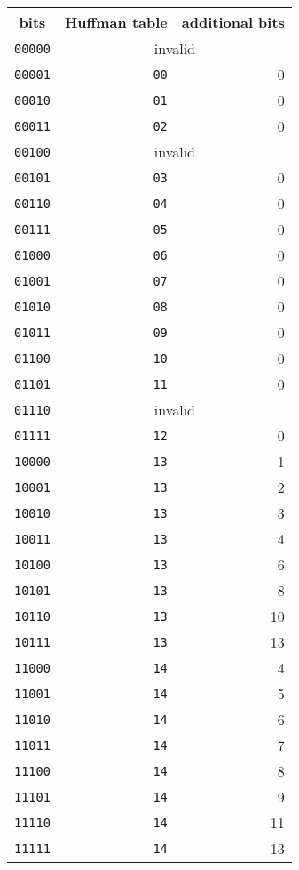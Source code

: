 \documentclass[letter]{scrbook}
\begin{document}
\begin{table}[h]
\begin{tabular}{|c|r|r|}
\hline
bits & Huffman table & additional bits \\
\hline
\texttt{00000} & \multicolumn{2}{c|}{invalid} \\
\texttt{00001} & \texttt{00} & 0 \\
\texttt{00010} & \texttt{01} & 0 \\
\texttt{00011} & \texttt{02} & 0 \\
\texttt{00100} & \multicolumn{2}{c|}{invalid} \\
\texttt{00101} & \texttt{03} & 0 \\
\texttt{00110} & \texttt{04} & 0 \\
\texttt{00111} & \texttt{05} & 0 \\
\texttt{01000} & \texttt{06} & 0 \\
\texttt{01001} & \texttt{07} & 0 \\
\texttt{01010} & \texttt{08} & 0 \\
\texttt{01011} & \texttt{09} & 0 \\
\texttt{01100} & \texttt{10} & 0 \\
\texttt{01101} & \texttt{11} & 0 \\
\texttt{01110} & \multicolumn{2}{c|}{invalid} \\
\texttt{01111} & \texttt{12} & 0 \\
\texttt{10000} & \texttt{13} & 1 \\
\texttt{10001} & \texttt{13} & 2 \\
\texttt{10010} & \texttt{13} & 3 \\
\texttt{10011} & \texttt{13} & 4 \\
\texttt{10100} & \texttt{13} & 6 \\
\texttt{10101} & \texttt{13} & 8 \\
\texttt{10110} & \texttt{13} & 10 \\
\texttt{10111} & \texttt{13} & 13 \\
\texttt{11000} & \texttt{14} & 4 \\
\texttt{11001} & \texttt{14} & 5 \\
\texttt{11010} & \texttt{14} & 6 \\
\texttt{11011} & \texttt{14} & 7 \\
\texttt{11100} & \texttt{14} & 8 \\
\texttt{11101} & \texttt{14} & 9 \\
\texttt{11110} & \texttt{14} & 11 \\
\texttt{11111} & \texttt{14} & 13 \\
\hline
\end{tabular}
\end{table}
\end{document}
